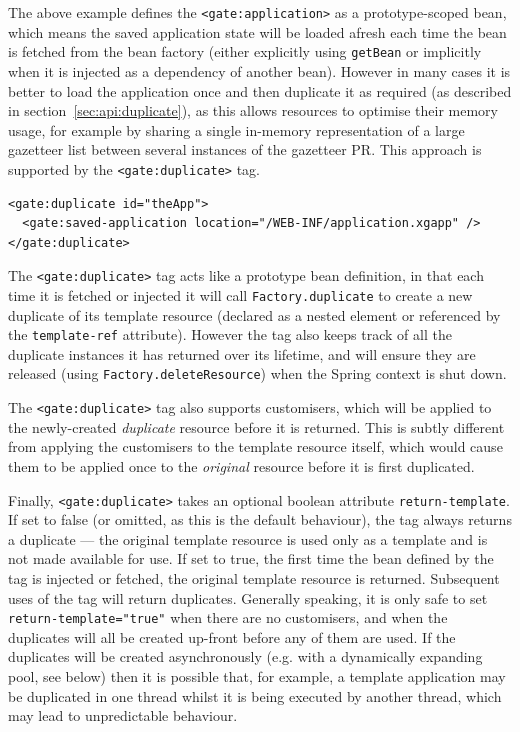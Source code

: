 The above example defines the \verb|<gate:application>| as a prototype-scoped
bean, which means the saved application state will be loaded afresh each time
the bean is fetched from the bean factory (either explicitly using
\verb|getBean| or implicitly when it is injected as a dependency of another
bean).  However in many cases it is better to load the application once and
then duplicate it as required (as described in
section~\ref{sec:api:duplicate}), as this allows resources to optimise their
memory usage, for example by sharing a single in-memory representation of a
large gazetteer list between several instances of the gazetteer PR.  This
approach is supported by the \verb|<gate:duplicate>| tag.
\begin{small}\begin{verbatim}
<gate:duplicate id="theApp">
  <gate:saved-application location="/WEB-INF/application.xgapp" />
</gate:duplicate>
\end{verbatim}\end{small}
%
The \verb|<gate:duplicate>| tag acts like a prototype bean definition, in that
each time it is fetched or injected it will call \texttt{Factory.duplicate} to
create a new duplicate of its template resource (declared as a nested element
or referenced by the \verb|template-ref| attribute).  However the tag also
keeps track of all the duplicate instances it has returned over its lifetime,
and will ensure they are released (using \texttt{Factory.deleteResource}) when
the Spring context is shut down.

The \verb|<gate:duplicate>| tag also supports customisers, which will be
applied to the newly-created \emph{duplicate} resource before it is returned.
This is subtly different from applying the customisers to the template resource
itself, which would cause them to be applied once to the \emph{original}
resource before it is first duplicated.

Finally, \verb|<gate:duplicate>| takes an optional boolean attribute
\verb|return-template|.  If set to false (or omitted, as this is the default
behaviour), the tag always returns a duplicate --- the original template
resource is used only as a template and is not made available for use.  If set
to true, the first time the bean defined by the tag is injected or fetched, the
original template resource is returned.  Subsequent uses of the tag will return
duplicates.  Generally speaking, it is only safe to set
\verb|return-template="true"| when there are no customisers, and when the
duplicates will all be created up-front before any of them are used.  If the
duplicates will be created asynchronously (e.g. with a dynamically expanding
pool, see below) then it is possible that, for example, a template application
may be duplicated in one thread whilst it is being executed by another thread,
which may lead to unpredictable behaviour.

